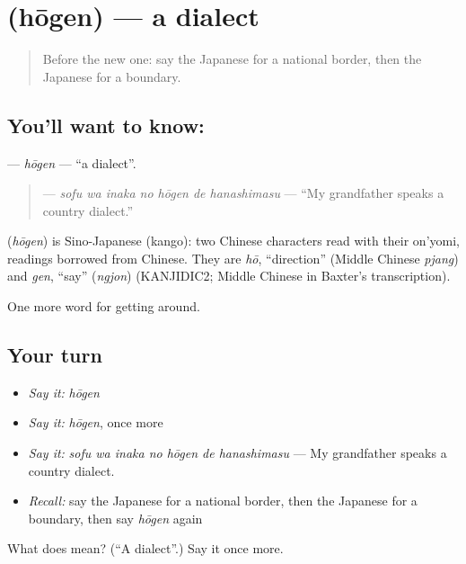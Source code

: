 \section[\texorpdfstring{\ja{ほうげん} (hōgen)}{ほうげん (hōgen)}]{ (hōgen) — a dialect}

\label{lesson:JA-C409-hougen}



\begin{quote}
Before the new one: say the Japanese for a national border, then the Japanese for a boundary.
\end{quote}

\subsection*{You'll want to know: }
\textbf{} — \emph{hōgen} — \textquotedblleft{}a dialect\textquotedblright{}.

\begin{quote}
\textbf{   } — \emph{sofu wa inaka no hōgen de hanashimasu} — \textquotedblleft{}My grandfather speaks a country dialect.\textquotedblright{}
\end{quote}

\begin{cousinweb}
\textbf{} (\emph{hōgen}) is Sino-Japanese (kango): two Chinese characters read with their on'yomi, readings borrowed from Chinese. They are \emph{hō}, \textquotedblleft{}direction\textquotedblright{} (Middle Chinese \emph{pjang}) and \emph{gen}, \textquotedblleft{}say\textquotedblright{} (\emph{ngjon}) (KANJIDIC2; Middle Chinese in Baxter's transcription).
\end{cousinweb}

\begin{grammarlens}[title={What you've built}]
One more word for getting around.
\end{grammarlens}

\subsection*{Your turn}
\begin{itemize}
\raggedright
  \item \emph{Say it:} \emph{hōgen}
  \item \emph{Say it:} \emph{hōgen}, once more
  \item \emph{Say it:} \emph{sofu wa inaka no hōgen de hanashimasu} — My grandfather speaks a country dialect.
  \item \emph{Recall:} say the Japanese for a national border, then the Japanese for a boundary, then say \emph{hōgen} again
\end{itemize}

\begin{tcolorbox}[breakable,colback=teal!4,colframe=teal!35!black,title={Before you move on}]
What does  mean? (\textquotedblleft{}A dialect\textquotedblright{}.) Say it once more.
\end{tcolorbox}
